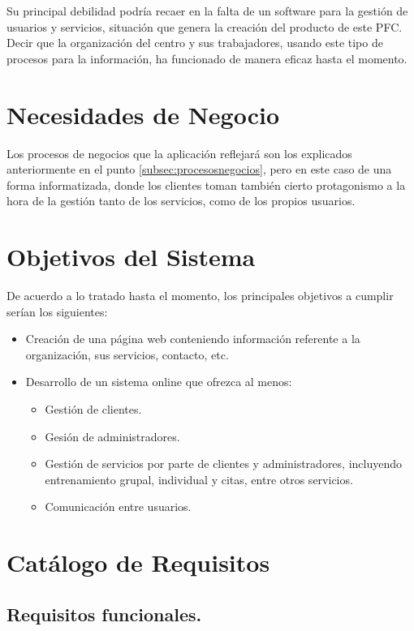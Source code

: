 Su principal debilidad podría recaer en la falta de un software para la gestión de usuarios y servicios, situación que genera la creación del producto de este PFC. Decir que la organización del centro y sus trabajadores, usando este tipo de procesos para la información, ha funcionado de manera eficaz hasta el momento.


\section{Necesidades de Negocio}

Los procesos de negocios que la aplicación reflejará son los explicados anteriormente en el punto \ref{subsec:procesosnegocios}, pero en este caso de una forma informatizada, donde los clientes toman también cierto protagonismo a la hora de la gestión tanto de los servicios, como de los propios usuarios.


\section{Objetivos del Sistema}

De acuerdo a lo tratado hasta el momento, los principales objetivos a cumplir serían los siguientes: 

\begin{itemize}
\item Creación de una página web conteniendo información referente a la organización, sus servicios, contacto, etc. 
\item Desarrollo de un sistema online que ofrezca al menos: 
\begin{itemize}
\item Gestión de clientes.
\item Gesión de administradores.
\item Gestión de servicios por parte de clientes y administradores, incluyendo entrenamiento grupal, individual y citas, entre otros servicios.
\item Comunicación entre usuarios.
\end {itemize}
\end{itemize}


\section{Catálogo de Requisitos}

\subsection{Requisitos funcionales.}\label{subsec:requisitosfuncionales}

